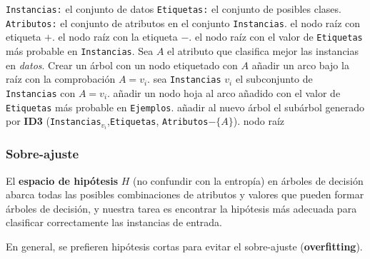 \begin{algorithmic}
	\REQUIRE \texttt{Instancias:} el conjunto de datos
	\REQUIRE \texttt{Etiquetas:} el conjunto de posibles clases.
	\REQUIRE \texttt{Atributos:} el conjunto de atributos en el conjunto \texttt{Instancias}.
	\RETURN el nodo raíz con etiqueta $+$.
	\RETURN el nodo raíz con la etiqueta $-$.
	\RETURN el nodo raíz con el valor de \texttt{Etiquetas} más probable en \texttt{Instancias}.
	\ENDIF
	\STATE Sea $A$ el atributo que clasifica mejor las instancias en \textit{datos}.
	\STATE Crear un árbol con un nodo etiquetado con $A$
	\STATE añadir un arco bajo la raíz con la comprobación $A=v_i$.
	\STATE sea \texttt{Instancias} $v_i$ el subconjunto de \texttt{Instancias} con $A=v_i$.
	\STATE añadir un nodo hoja al arco añadido con el valor de \texttt{Etiquetas} más probable en \texttt{Ejemplos}.
	\ELSE 
	\STATE añadir al nuevo árbol el subárbol generado por \textbf{ID3} (\texttt{Instancias}$_{v_i}$,\texttt{Etiquetas}, \texttt{Atributos}$-\{A\}$).
	\ENDIF
	\ENDFOR
	\RETURN nodo raíz
\end{algorithmic}
\subsubsection{Sobre-ajuste}
El \textbf{espacio de hipótesis} $H$ (no confundir con la entropía) en árboles de decisión
abarca todas las posibles combinaciones de atributos y valores que pueden formar
árboles de decisión, y nuestra tarea es encontrar la hipótesis más adecuada para
clasificar correctamente las instancias de entrada.

En general, se prefieren hipótesis cortas para evitar el sobre-ajuste (\textbf{overfitting}).

